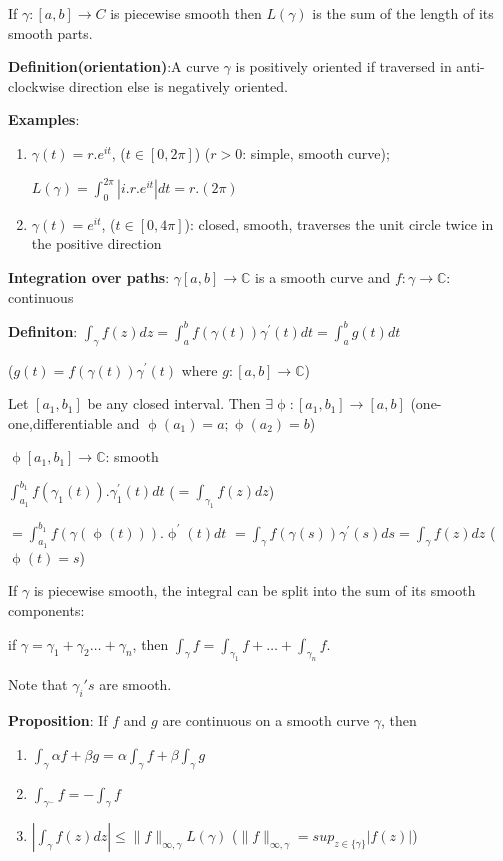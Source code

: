 \documentclass{article}
\begin{document}
\begin{flushleft}
If $\gamma:[a,b]\rightarrow C$ is piecewise smooth then $L(\gamma)$ is the sum of the length of its smooth parts.

\textbf{Definition(orientation)}:A curve $\gamma$ is positively oriented if traversed in anti-clockwise direction else is negatively oriented.

\textbf{Examples}:
\begin{enumerate}
    \item $\gamma(t)=r.e^{it}$, ($t\in [0,2\pi]$) ($r>0$: simple, smooth curve); 
    
    $L(\gamma)=\int_{0}^{2\pi} |i.r.e^{it}| dt= r.(2\pi)$
    
    \item $\gamma(t)=e^{it}$, ($t \in [0,4\pi]$): closed, smooth, traverses the unit circle twice in the positive direction
\end{enumerate}
\textbf{Integration over paths}:
$\gamma[a,b]\rightarrow \mathds{C}$ is a smooth curve and $f:\gamma \rightarrow \mathds{C}$: continuous 

\textbf{Definiton}: $\int_{\gamma}^{} f(z) dz= \int_{a}^{b} f(\gamma(t)) \gamma^{'}(t) dt=\int_{a}^{b}g(t) dt$ 

($g(t)=f(\gamma(t)) \gamma^{'}(t)$ where $g:[a,b]\rightarrow \mathds{C}$)

Let $[a_1,b_1]$ be any closed interval. Then $\exists \upphi:[a_1,b_1]\rightarrow [a,b]$ (one-one,differentiable and $\upphi(a_1)=a;\upphi(a_2)=b$)

$\upphi[a_1,b_1] \rightarrow \mathds{C}$: smooth 

$\int_{a_1}^{b_1}f(\gamma_1(t)).\gamma_1^{'}(t)dt$ ($=\int_{\gamma_1}^{}f(z) dz$)

$=\int_{a_1}^{b_1}f(\gamma(\upphi(t))).\upphi^{'}(t) dt$
$=\int_{\gamma}^{} f(\gamma(s)) \gamma^{'}(s) ds=\int_{\gamma}^{}f(z) dz$ ($\upphi(t)=s$)

If $\gamma$ is piecewise smooth, the integral can be split into the sum of its smooth components:

if $\gamma=\gamma_1+\gamma_2 \dots +\gamma_n$, then $\int_{\gamma}^{} f = \int_{\gamma_1}^{} f + \dots + \int_{\gamma_n}^{} f$.

Note that $\gamma_i's$ are smooth.

\textbf{Proposition}: If $f$ and $g$ are continuous on a smooth curve $\gamma$, then 
\begin{enumerate}
    \item $\int_{\gamma}^{} \alpha f+\beta g = \alpha \int_{\gamma}^{} f + \beta\int_{\gamma}^{} g$
    \item $\int_{\gamma^{-}}^{} f = - \int_{\gamma}^{} f$
    \item $|\int_{\gamma}^{} f(z) dz| \leq \|f\|_{\infty,\gamma} L(\gamma)$ ($\|f\|_{\infty,\gamma}=sup_{z\in \{\gamma\}}|f(z)|$)
\end{enumerate}


\end{flushleft}
\end{document}
